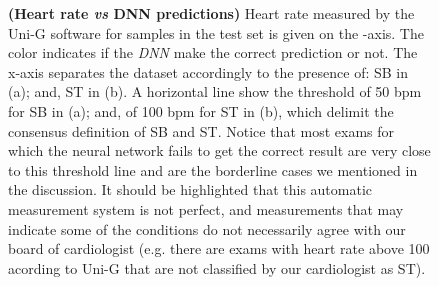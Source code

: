 \documentclass{article}
\begin{document}
\begin{figure}[h]
    \centering
    \caption{\textbf{(Heart rate \textit{vs} DNN predictions)} Heart rate measured by the Uni-G software for samples in the test set is given on the -axis. The color indicates if the \textit{DNN} make the correct prediction or not. The x-axis separates the dataset accordingly to the presence of: SB in (a); and, ST in (b). A horizontal line show the threshold of 50 bpm for SB in (a); and, of 100 bpm for ST in (b), which delimit the consensus definition of SB and ST. Notice that most exams for which the neural network fails to get the correct result are very close to this threshold line and are the borderline cases we mentioned in the discussion. It should be highlighted that this automatic measurement system is not perfect, and measurements that may indicate some of the conditions  do not necessarily agree with our board of cardiologist (e.g. there are exams with heart rate above 100 acording to Uni-G that are not classified by our cardiologist as ST).}
    \label{fig:heart_rate_vs_mistakes}
\end{figure}
\end{document}
